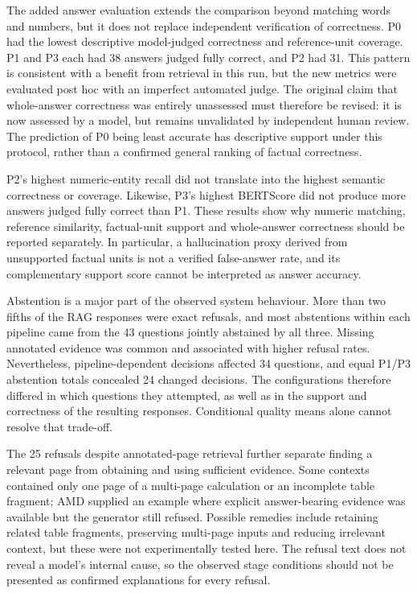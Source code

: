 The added answer evaluation extends the comparison beyond matching words and
numbers, but it does not replace independent verification of correctness.
P0 had the lowest descriptive model-judged correctness and reference-unit
coverage. P1 and P3 each had 38 answers judged fully correct, and P2 had 31.
This pattern is consistent with a benefit from retrieval in this run, but the
new metrics were evaluated post hoc with an imperfect automated judge.
The original claim that whole-answer correctness was entirely unassessed
must therefore be revised: it is now assessed by a model, but remains
unvalidated by independent human review. The prediction of P0 being least
accurate has descriptive support under this protocol, rather than a confirmed
general ranking of factual correctness.

P2's highest numeric-entity recall did not translate into the highest semantic
correctness or coverage. Likewise, P3's highest BERTScore did not produce more
answers judged fully correct than P1. These results show why numeric matching,
reference similarity, factual-unit support and whole-answer correctness should
be reported separately. In particular, a hallucination proxy derived from
unsupported factual units is not a verified false-answer rate, and its
complementary support score cannot be interpreted as answer accuracy.

Abstention is a major part of the observed system behaviour. More than two
fifths of the RAG responses were exact refusals, and most abstentions within
each pipeline came from the 43 questions jointly abstained by all three.
Missing annotated evidence was common and associated with higher refusal
rates. Nevertheless, pipeline-dependent decisions affected 34 questions,
and equal P1/P3 abstention totals concealed 24 changed decisions. The
configurations therefore differed in which questions they attempted, as well
as in the support and correctness of the resulting responses. Conditional
quality means alone cannot resolve that trade-off.

The 25 refusals despite annotated-page retrieval further separate finding a
relevant page from obtaining and using sufficient evidence. Some contexts
contained only one page of a multi-page calculation or an incomplete table
fragment; AMD supplied an example where explicit answer-bearing evidence was
available but the generator still refused. Possible remedies include retaining
related table fragments, preserving multi-page inputs and reducing irrelevant
context, but these were not experimentally tested here. The refusal text
does not reveal a model's internal cause, so the observed stage conditions
should not be presented as confirmed explanations for every refusal.

